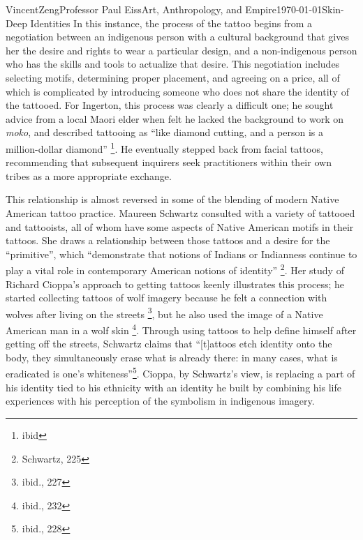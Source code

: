 \documentclass[12pt]{article}
\begin{document}
\begin{mla}{Vincent}{Zeng}{Professor Paul Eiss}{Art, Anthropology, and
  Empire}{\today}{Skin-Deep Identities}
In this instance, the process of the tattoo begins from a negotiation between an
indigenous person with a cultural background that gives her the desire and
rights to wear a particular design, and a non-indigenous person who has the
skills and tools to actualize that desire. This negotiation includes selecting
motifs, determining proper placement, and agreeing on a price, all of which is
complicated by introducing someone who does not share the identity of the
tattooed. For Ingerton, this process was clearly a difficult one; he sought
advice from a local Maori elder when felt he lacked the background to
work on \textit{moko}, and described tattooing as ``like diamond cutting, and a
person is a million-dollar diamond'' \footnote{ibid}. He eventually stepped back
from facial tattoos, recommending that subsequent inquirers seek
practitioners within their own tribes as a more appropriate exchange.

This relationship is almost reversed in some of the blending of modern Native American
tattoo practice. Maureen Schwartz consulted with a variety of tattooed and
tattooists, all of whom have some aspects of Native American motifs in their
tattoos. She draws a relationship between those tattoos and a desire for the
``primitive'', which ``demonstrate that notions of Indians or Indianness
continue to play a vital role in contemporary American notions of identity''
\footnote{Schwartz, 225}. Her study of Richard Cioppa's approach to getting
tattoos keenly illustrates this process; he started collecting tattoos of wolf
imagery because he felt a connection with wolves after living on the streets
\footnote{ibid., 227}, but he also used the image of a Native American man in a
wolf skin \footnote{ibid., 232}. Through using tattoos to help define himself
after getting off the streets, Schwartz claims that ``[t]attoos etch identity
onto the body, they simultaneously erase what is already there: in many cases,
what is eradicated is one's whiteness''\footnote{ibid., 228}. Cioppa, by
Schwartz's view, is replacing a part of his identity tied to his
ethnicity with an identity he built by combining his life experiences with his
perception of the symbolism in indigenous imagery.


\end{mla}
\end{document}
